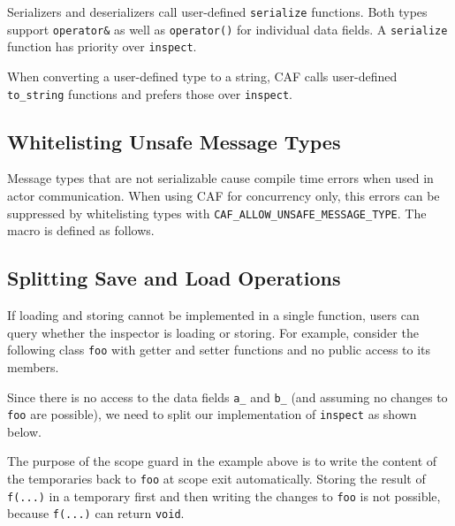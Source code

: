 Serializers and deserializers call user-defined \lstinline^serialize^
functions. Both types support \lstinline^operator&^ as well as
\lstinline^operator()^ for individual data fields. A \lstinline^serialize^
function has priority over \lstinline^inspect^.

When converting a user-defined type to a string, CAF calls user-defined
\lstinline^to_string^ functions and prefers those over \lstinline^inspect^.

\subsection{Whitelisting Unsafe Message Types}
\label{unsafe-message-type}

Message types that are not serializable cause compile time errors when used in
actor communication. When using CAF for concurrency only, this errors can be
suppressed by whitelisting types with
\lstinline^CAF_ALLOW_UNSAFE_MESSAGE_TYPE^. The macro is defined as follows.


\clearpage
\subsection{Splitting Save and Load Operations}

If loading and storing cannot be implemented in a single function, users can
query whether the inspector is loading or storing. For example, consider the
following class \lstinline^foo^ with getter and setter functions and no public
access to its members.


\clearpage
Since there is no access to the data fields \lstinline^a_^ and \lstinline^b_^
(and assuming no changes to \lstinline^foo^ are possible), we need to split our
implementation of \lstinline^inspect^ as shown below.


The purpose of the scope guard in the example above is to write the content of
the temporaries back to \lstinline^foo^ at scope exit automatically. Storing
the result of \lstinline^f(...)^ in a temporary first and then writing the
changes to \lstinline^foo^ is not possible, because \lstinline^f(...)^ can
return \lstinline^void^.
